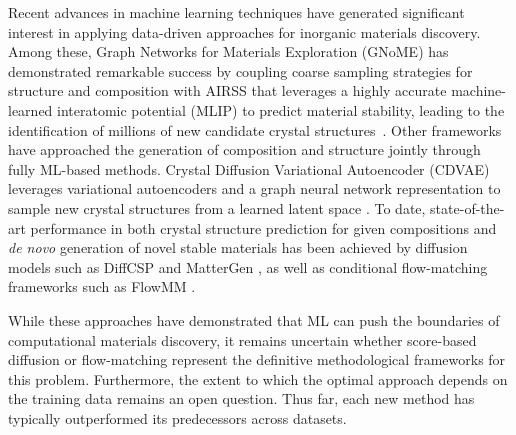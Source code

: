 Recent advances in machine learning techniques have generated significant interest in applying data-driven approaches for inorganic materials discovery. Among these, Graph Networks for Materials Exploration (GNoME) has demonstrated remarkable success by coupling coarse sampling strategies for structure and composition with AIRSS that leverages a highly accurate machine-learned interatomic potential (MLIP) to predict material stability, leading to the identification of millions of new candidate crystal structures~\citep{merchant_scaling_2023}. 
Other frameworks have approached the generation of composition and structure jointly through fully ML-based methods. Crystal Diffusion Variational Autoencoder (CDVAE) leverages variational autoencoders and a graph neural network representation to sample new crystal structures from a learned latent space \citep{xie_crystal_2022}. To date, state-of-the-art performance in both crystal structure prediction for given compositions and \emph{de novo} generation of novel stable materials has been achieved by diffusion models such as DiffCSP \citep{jiao_crystal_2023} and MatterGen \citep{zeni_generative_2025}, as well as conditional flow-matching frameworks such as FlowMM \citep{miller_flowmm_2024}. 

While these approaches have demonstrated that ML can push the boundaries of computational materials discovery, it remains uncertain whether score-based diffusion or flow-matching represent the definitive methodological frameworks for this problem. Furthermore, the extent to which the optimal approach depends on the training data remains an open question. Thus far, each new method has typically outperformed its predecessors across datasets.


